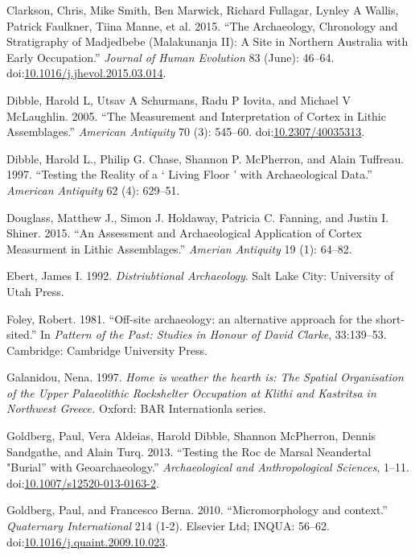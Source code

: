 \documentclass[smallextended]{svjour3}       %
\begin{document}
\hypertarget{ref-clarkson_archaeology_2015}{}
Clarkson, Chris, Mike Smith, Ben Marwick, Richard Fullagar, Lynley A
Wallis, Patrick Faulkner, Tiina Manne, et al. 2015. ``The Archaeology,
Chronology and Stratigraphy of Madjedbebe (Malakunanja II): A Site in
Northern Australia with Early Occupation.'' \emph{Journal of Human
Evolution} 83 (June): 46--64.
doi:\href{https://doi.org/10.1016/j.jhevol.2015.03.014}{10.1016/j.jhevol.2015.03.014}.

\hypertarget{ref-dibble_measurement_2005}{}
Dibble, Harold L, Utsav A Schurmans, Radu P Iovita, and Michael V
McLaughlin. 2005. ``The Measurement and Interpretation of Cortex in
Lithic Assemblages.'' \emph{American Antiquity} 70 (3): 545--60.
doi:\href{https://doi.org/10.2307/40035313}{10.2307/40035313}.

\hypertarget{ref-Dibble1997}{}
Dibble, Harold L., Philip G. Chase, Shannon P. McPherron, and Alain
Tuffreau. 1997. ``Testing the Reality of a ` Living Floor ' with
Archaeological Data.'' \emph{American Antiquity} 62 (4): 629--51.

\hypertarget{ref-Douglass2015}{}
Douglass, Matthew J., Simon J. Holdaway, Patricia C. Fanning, and Justin
I. Shiner. 2015. ``An Assessment and Archaeological Application of
Cortex Measurment in Lithic Assemblages.'' \emph{Amerian Antiquity} 19
(1): 64--82.

\hypertarget{ref-Ebert1992}{}
Ebert, James I. 1992. \emph{Distriubtional Archaeology}. Salt Lake City:
University of Utah Press.

\hypertarget{ref-Foley1981a}{}
Foley, Robert. 1981. ``Off-site archaeology: an alternative approach for
the short-sited.'' In \emph{Pattern of the Past: Studies in Honour of
David Clarke}, 33:139--53. Cambridge: Cambridge University Press.

\hypertarget{ref-Galanidou1997}{}
Galanidou, Nena. 1997. \emph{Home is weather the hearth is: The Spatial
Organisation of the Upper Palaeolithic Rockshelter Occupation at Klithi
and Kastritsa in Northwest Greece.} Oxford: BAR Internationla series.

\hypertarget{ref-goldberg_testing_2013}{}
Goldberg, Paul, Vera Aldeias, Harold Dibble, Shannon McPherron, Dennis
Sandgathe, and Alain Turq. 2013. ``Testing the Roc de Marsal Neandertal
"Burial'' with Geoarchaeology.'' \emph{Archaeological and
Anthropological Sciences}, 1--11.
doi:\href{https://doi.org/10.1007/s12520-013-0163-2}{10.1007/s12520-013-0163-2}.

\hypertarget{ref-Goldberg2010}{}
Goldberg, Paul, and Francesco Berna. 2010. ``Micromorphology and
context.'' \emph{Quaternary International} 214 (1-2). Elsevier Ltd;
INQUA: 56--62.
doi:\href{https://doi.org/10.1016/j.quaint.2009.10.023}{10.1016/j.quaint.2009.10.023}.
\end{document}
